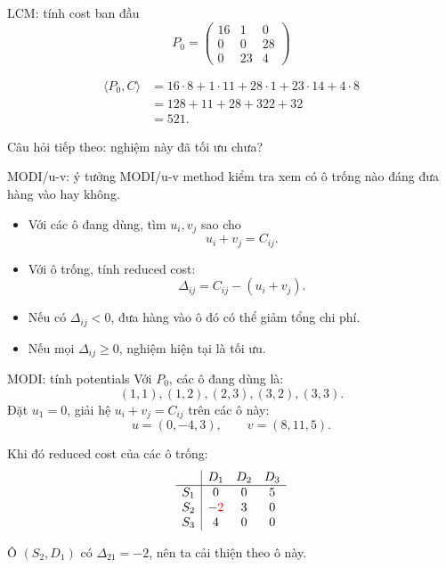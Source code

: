 \documentclass[10pt]{beamer}
\begin{document}
\begin{frame}{LCM: tính cost ban đầu}
    \[
    P_0=
    \begin{pmatrix}
    16&1&0\\
    0&0&28\\
    0&23&4
    \end{pmatrix}
    \]

    \[
    \begin{aligned}
    \langle P_0,C\rangle
    &=16\cdot 8+1\cdot 11+28\cdot 1+23\cdot 14+4\cdot 8\\
    &=128+11+28+322+32\\
    &=521.
    \end{aligned}
    \]

    Câu hỏi tiếp theo: nghiệm này đã tối ưu chưa?
\end{frame}

\begin{frame}{MODI/u-v: ý tưởng}
    MODI/u-v method kiểm tra xem có ô trống nào đáng đưa hàng vào hay không.

    \begin{itemize}
        \item Với các ô đang dùng, tìm $u_i,v_j$ sao cho
        \[
            u_i+v_j=C_{ij}.
        \]
        \item Với ô trống, tính reduced cost:
        \[
            \Delta_{ij}=C_{ij}-(u_i+v_j).
        \]
        \item Nếu có $\Delta_{ij}<0$, đưa hàng vào ô đó có thể giảm tổng chi phí.
        \item Nếu mọi $\Delta_{ij}\ge 0$, nghiệm hiện tại là tối ưu.
    \end{itemize}
\end{frame}

\begin{frame}{MODI: tính potentials}
    Với $P_0$, các ô đang dùng là:
    \[
        (1,1),(1,2),(2,3),(3,2),(3,3).
    \]
    Đặt $u_1=0$, giải hệ $u_i+v_j=C_{ij}$ trên các ô này:
    \[
        u=(0,-4,3),\qquad v=(8,11,5).
    \]

    Khi đó reduced cost của các ô trống:
    \[
    \begin{array}{c|ccc}
        & D_1&D_2&D_3\\
        \hline
        S_1&0&0&5\\
        S_2&\color{red}{-2}&3&0\\
        S_3&4&0&0
    \end{array}
    \]

    Ô $(S_2,D_1)$ có $\Delta_{21}=-2$, nên ta cải thiện theo ô này.
\end{frame}
\end{document}
